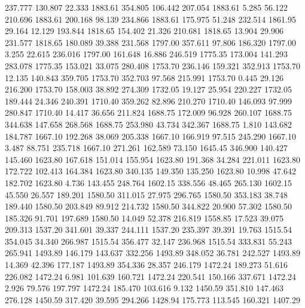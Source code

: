  237.777  130.807   22.333      1883.61
 354.805  106.442  207.054      1883.61
   5.285   56.122  210.696      1883.61
 200.168   98.139  234.866      1883.61
 175.975   51.248  232.514      1861.95
  29.164   12.129  193.844      1818.65
 154.402   21.326  210.681      1818.65
  13.904   29.906  231.577      1818.65
 180.089   39.388  231.568      1797.00
 357.611   97.806  186.320      1797.00
   3.255   22.615  236.016      1797.00
 161.648   16.886  246.519      1775.35
 173.004  141.293  283.078      1775.35
 153.021   33.075  280.408      1753.70
 236.146  159.321  352.913      1753.70
  12.135  140.843  359.705      1753.70
 352.703   97.568  215.991      1753.70
   0.445   29.126  216.200      1753.70
 158.003   38.892  274.309      1732.05
  19.127   25.954  220.227      1732.05
 189.444   24.346  240.391      1710.40
 359.262   82.896  210.270      1710.40
 146.093   97.999  280.847      1710.40
  14.417   36.656  211.824      1688.75
 172.009   96.928  260.107      1688.75
 344.638  147.658  268.568      1688.75
 253.980   43.734  342.367      1688.75
   1.810  143.682  184.787      1667.10
 192.268   38.069  205.338      1667.10
 166.919   97.515  245.290      1667.10
   3.487   88.751  235.718      1667.10
 271.261  162.589   73.150      1645.45
 346.900  140.427  145.460      1623.80
 167.618  151.014  155.954      1623.80
 191.368   34.284  221.011      1623.80
 172.722  102.413  164.384      1623.80
 340.135  149.350  135.250      1623.80
  10.998   47.642  182.702      1623.80
   4.736  143.455  248.764      1602.15
 338.556   48.465  265.130      1602.15
  45.550   26.557  189.201      1580.50
 311.015   27.975  296.765      1580.50
 353.183   38.748  189.440      1580.50
 203.849   89.912  214.732      1580.50
 344.822   20.900   57.302      1580.50
 185.326   91.701  197.689      1580.50
  14.049   52.378  216.819      1558.85
  17.523   39.075  209.313      1537.20
 341.601   39.337  244.111      1537.20
 235.397   39.391   19.763      1515.54
 354.045   34.340  266.987      1515.54
 356.477   32.147  236.968      1515.54
 333.831   55.243  265.941      1493.89
 146.179  143.637  332.256      1493.89
 348.052   36.781  242.527      1493.89
  14.369   42.396  177.187      1493.89
 354.336   28.357  246.179      1472.24
 189.273   51.616  226.082      1472.24
   6.981  101.639  160.721      1472.24
 220.541  150.166  337.671      1472.24
   2.926   79.576  197.797      1472.24
 185.470  103.616    9.132      1450.59
 351.810  147.463  276.128      1450.59
 317.420   39.595  294.266      1428.94
 175.773  113.545  160.321      1407.29
